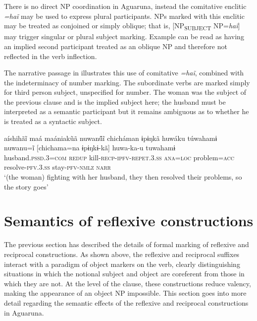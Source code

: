 \documentclass[output=paper]{langscibook}
\begin{document}
There is no direct NP coordination in Aguaruna, instead the comitative enclitic \textit{=haĩ} may be used to express plural participants. NPs marked with this enclitic may be treated as conjoined or simply oblique; that is, [NP\textsubscript{SUBJECT} NP=\textit{haĩ}] may trigger singular or plural subject marking. Example  can be read as having an implied second participant treated as an oblique NP and therefore not reflected in the verb inflection.

The narrative passage in  illustrates this use of comitative \textit{=haĩ}, combined with the indeterminacy of number marking. The subordinate verbs are marked simply for third person subject, unspecified for number. The woman was the subject of the previous clause and is the implied subject here; the husband must be interpreted as a semantic participant but it remains ambiguous as to whether he is treated as a syntactic subject.

\ea%
    \label{ex:overall:21}
    \glll aíshihãĩ maá maániak\~uã nuwanṹĩ chicháman ɨpɨŋkã huwáku túwahamɨ\\
 [aishĩ=haĩ  maa  maa-nai-a-kawã]  nuwanu=ĩ   [chichama=na  ɨpɨŋkɨ-kã]  huwa-ka-u  tuwahamɨ\\
  husband\textsc{.pssd.3=com}  \textsc{redup}  kill\textsc{{}-recp-ipfv-repet.3.ss}  \textsc{ana=loc} problem\textsc{=acc} resolve\textsc{{}-pfv.3.ss} stay\textsc{{}-pfv-nmlz}  \textsc{narr}\\
  \glt  ‘(the woman) fighting with her husband, they then resolved their problems, so the story goes’ \citep[311]{Overall2017}
\z

\section{Semantics of reflexive constructions} %
\label{sec:overall:4}

The previous section has described the details of formal marking of
reflexive and reciprocal constructions. As shown above, the reflexive and reciprocal suffixes interact with a paradigm of object markers on the verb, clearly distinguishing situations in which the notional subject and object are coreferent from those in which they are not. At the level of the clause, these constructions reduce valency, making the appearance of an object NP impossible. This section goes into more detail regarding the semantic effects of the reflexive and reciprocal constructions in Aguaruna.
\end{document}
